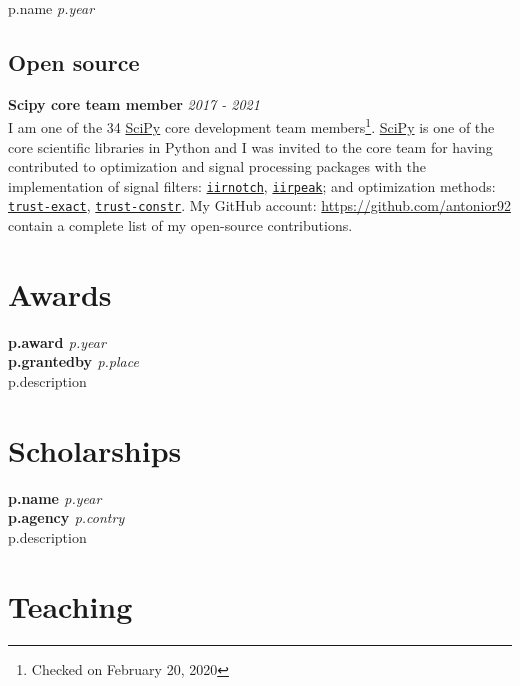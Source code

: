\documentclass[10pt,letterpaper]{article} %
\begin{document}
{{{{{{{%
        {{ p.name }} \hfill {\em {{ p.year }} }
{%

\subsection*{Open source}

{\bf Scipy  core team member} \hfill {\em 2017 - 2021} \\
I am one of the 34 \href{https://www.scipy.org}{SciPy} core development  team members\footnote{Checked on February 20, 2020}.
\href{https://www.scipy.org}{SciPy} is one of the core scientific libraries in Python and I was invited to the core team for having contributed to optimization and signal processing packages with the implementation of signal filters: \href{http://scipy.github.io/devdocs/generated/scipy.signal.iirnotch.html}{\texttt{iirnotch}}, \href{http://scipy.github.io/devdocs/generated/scipy.signal.iirpeak.html}{\texttt{iirpeak}}; and optimization methods: \href{http://scipy.github.io/devdocs/optimize.minimize-trustexact.html}{\texttt{trust-exact}}, \href{http://scipy.github.io/devdocs/optimize.minimize-trustconstr.html}{\texttt{trust-constr}}. My GitHub account: \href{https://github.com/antonior92}{https://github.com/antonior92} contain a complete list of my open-source contributions.

\section*{Awards}

{%
{\bf {{ p.award }}} \hfill {\em {{ p.year }} }\\
{\bf {{ p.grantedby }} } \hfill  {\em {{p.place}} } \\
    {{ p.description }}
{%

\section*{Scholarships}

{%
{\bf {{ p.name }}} \hfill {\em {{ p.year }} } \\
{\bf {{ p.agency }} } \hfill  {\em {{p.contry}} } \\
{{ p.description }}
{%

\section*{Teaching}

}}}}}}}}}}}}
\end{document}
